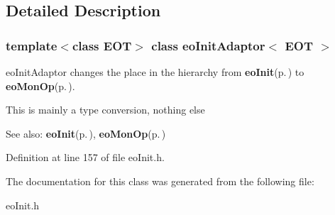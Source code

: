 \subsection{Detailed Description}
\subsubsection*{template$<$class EOT$>$ class eo\-Init\-Adaptor$<$ EOT $>$}

eo\-Init\-Adaptor changes the place in the hierarchy from {\bf eo\-Init}{\rm (p.\,\pageref{classeo_init})} to {\bf eo\-Mon\-Op}{\rm (p.\,\pageref{classeo_mon_op})}. 

This is mainly a type conversion, nothing else \begin{Desc}
\item[See also:]{\bf eo\-Init}{\rm (p.\,\pageref{classeo_init})}, {\bf eo\-Mon\-Op}{\rm (p.\,\pageref{classeo_mon_op})} \end{Desc}




Definition at line 157 of file eo\-Init.h.

The documentation for this class was generated from the following file:\begin{CompactItemize}
\item 
eo\-Init.h\end{CompactItemize}
